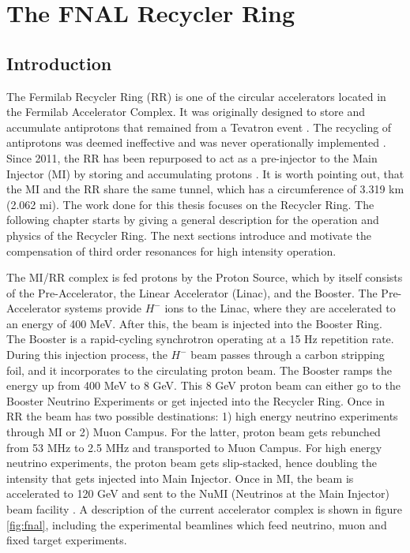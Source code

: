 \chapter{The FNAL Recycler Ring}
\label{sec:ch3}

\section{\label{sec:intro31}Introduction}
The Fermilab Recycler Ring (RR) is one of the circular accelerators located in the Fermilab Accelerator Complex. It was originally designed to store and accumulate antiprotons that remained from a Tevatron event \cite{rr0}. The recycling of antiprotons was deemed ineffective and was never operationally implemented \cite{rrnagaitsev}. Since 2011, the RR has been repurposed to act as a pre-injector to the Main Injector (MI) by storing and accumulating protons \cite{rr1}. It is worth pointing out, that the MI and the RR share the same tunnel, which has a circumference of 3.319 km (2.062 mi). The work done for this thesis focuses on the Recycler Ring. The following chapter starts by giving a general description for the operation and physics of the Recycler Ring. The next sections introduce and motivate the compensation of third order resonances for high intensity operation.  

The MI/RR complex is fed protons by the Proton Source, which by itself consists of the Pre-Accelerator, the Linear Accelerator (Linac), and the Booster. The Pre-Accelerator systems provide $H^-$ ions to the Linac, where they are accelerated to an energy of 400 MeV. After this, the beam is injected into the Booster Ring. The Booster is a rapid-cycling synchrotron operating at a 15 Hz repetition rate. During this injection process, the $H^-$ beam passes through a carbon stripping foil, and it incorporates to the circulating proton beam. The Booster ramps the energy up from 400 MeV to 8 GeV. This 8 GeV proton beam can either go to the Booster Neutrino Experiments or get injected into the Recycler Ring. Once in RR the beam has two possible destinations: 1) high energy neutrino experiments through MI or 2) Muon Campus. For the latter, proton beam gets rebunched from 53 MHz to 2.5 MHz and transported to Muon Campus. For high energy neutrino experiments, the proton beam gets slip-stacked, hence doubling the intensity that gets injected into Main Injector. Once in MI, the beam is accelerated to 120 GeV and sent to the NuMI (Neutrinos at the Main Injector) beam facility \cite{rr1, rrnagaitsev, numi1}. A description of the current accelerator complex is shown in figure \ref{fig:fnal}, including the experimental beamlines which feed neutrino, muon and fixed target experiments.

